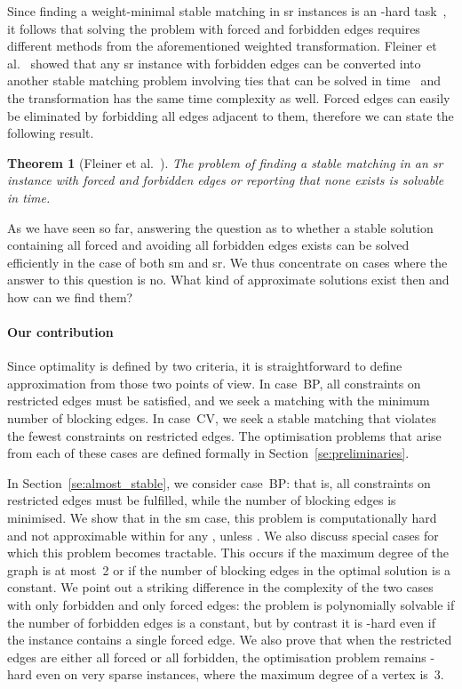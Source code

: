 \documentclass[preprint,12pt]{elsarticle}
\newtheorem{theorem}{Theorem}[section]
\begin{document}
Since finding a weight-minimal stable matching in {\sc sr} instances is an -hard task~\cite{Fed92}, it follows that solving the problem with forced and forbidden edges requires different methods from the aforementioned weighted transformation. Fleiner et al.~\cite{FIM07} showed that any {\sc sr} instance with forbidden edges can be converted into another stable matching problem involving ties that can be solved in  time~\cite{IM02} and the transformation has the same time complexity as well. Forced edges can easily be eliminated by forbidding all edges adjacent to them, therefore we can state the following result.

\begin{theorem}[Fleiner et al.~\cite{FIM07}]  
\label{th:sr_decision}
The problem of finding a stable matching in an {\sc sr}  instance with forced and forbidden edges or reporting that none exists is solvable in  time.
\end{theorem}

As we have seen so far, answering the question as to whether a stable solution containing all forced and avoiding all forbidden edges exists can be solved efficiently in the case of both {\sc sm} and {\sc sr}. We thus concentrate on cases where the answer to this question is no. What kind of approximate solutions exist then and how can we find them?

\paragraph{Our contribution} Since optimality is defined by two criteria, it is straightforward to define approximation from those two points of view. In case~BP, all constraints on restricted edges must be satisfied, and we seek a matching with the minimum number of blocking edges. In case~CV, we seek a stable matching that violates the fewest constraints on restricted edges.  The optimisation problems that arise from each of these cases are defined formally in Section~\ref{se:preliminaries}.

In Section~\ref{se:almost_stable}, we consider case~BP: that is, all constraints on restricted edges must be fulfilled, while the number of blocking edges is minimised. We show that in the {\sc sm} case, this problem is computationally hard and not approximable within  for any , unless . We also discuss special cases for which this problem becomes tractable. This occurs if the maximum degree of the graph is at most~2 or if the number of blocking edges in the optimal solution is a constant. We point out a striking difference in the complexity of the two cases with only forbidden and only forced edges: the problem is polynomially solvable if the number of forbidden edges is a constant, but by contrast it is -hard even if the instance contains a single forced edge. We also prove that when the restricted edges are either all forced or all forbidden, the optimisation problem remains -hard even on very sparse instances, where the maximum degree of a vertex is~3.
\end{document}
